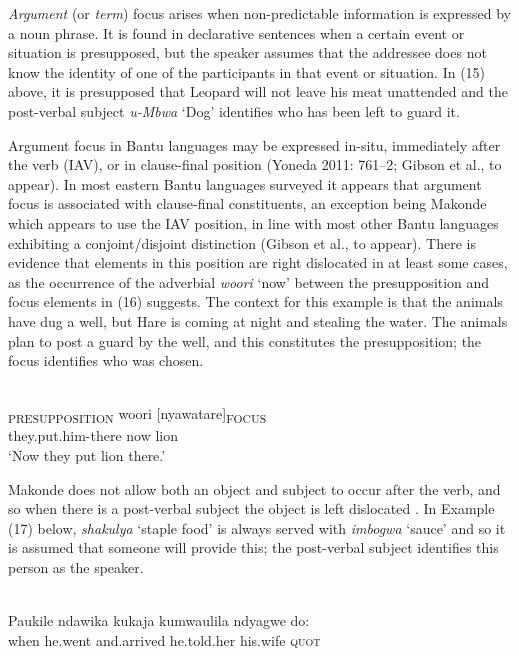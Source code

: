 \documentclass[output=paper]{langsci/langscibook}
\begin{document}
\textit{Argument} (or \textit{term}) focus arises when non-predictable information is expressed by a noun phrase. It is found in declarative sentences when a certain event or situation is presupposed, but the speaker assumes that the addressee does not know the identity of one of the participants in that event or situation. In (15) above, it is presupposed that Leopard will not leave his meat unattended and the post-verbal subject \textit{u}\textit{\nobreakdash-Mbwa} ‘Dog’ identifies who has been left to guard it.

Argument focus in Bantu languages may be expressed in-situ, immediately after the verb (IAV), or in clause-final position (Yoneda 2011: 761–2; Gibson et al., to appear). In most eastern Bantu languages surveyed it appears that argument focus is associated with clause-final constituents, an exception being Makonde which appears to use the IAV position, in line with most other Bantu languages exhibiting a conjoint/disjoint distinction (Gibson et al., to appear). There is evidence that elements in this position are right dislocated in at least some cases, as the occurrence of the adverbial \textit{woori} ‘now’ between the presupposition and focus elements in (16) suggests. The context for this example is that the animals have dug a well, but Hare is coming at night and stealing the water. The animals plan to post a guard by the well, and this constitutes the presupposition; the focus identifies who was chosen.

\ea\label{ex:}
\\
\gll [Mbamuta-ko]\textsubscript{PRESUPPOSITION} woori [nyawatare]\textsubscript{FOCUS}\\
they.put.him-there now lion\\


\glt \textup{‘}\textup{Now they put lion there.’}
\z

Makonde does not allow both an object and subject to occur after the verb, and so when there is a post-verbal subject the object is left dislocated \citep[91]{Leach2015}. In Example (17) below, \textit{shakulya} ‘staple food’ is always served with \textit{imbogwa} ‘sauce’ and so it is assumed that someone will provide this; the post-verbal subject identifies this person as the speaker.

\ea\label{ex:}
\\
\gll Paukile ndawika kukaja kumwaulila ndyagwe do:\\
when he.went and.arrived he.told.her his.wife \textsc{quot}\\
\end{document}

